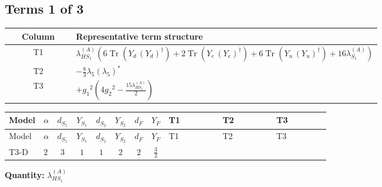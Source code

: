 \documentclass[8pt]{article}
\begin{document}
\begin{landscape}
\subsection*{Terms 1 of 3}
\begin{center}
\begin{tabular}{@{}c >{\raggedright\arraybackslash}p{0.82\linewidth}@{}}
\toprule
Column & Representative term structure \\
\midrule
T1 & \(\displaystyle {\lambda_{HS_1}^{(A)}} (6 \operatorname{Tr}\!\left({Y_d}\,\left({Y_d}\right)^{\dagger}\right)+2 \operatorname{Tr}\!\left({Y_e}\,\left({Y_e}\right)^{\dagger}\right)+6 \operatorname{Tr}\!\left({Y_u}\,\left({Y_u}\right)^{\dagger}\right)+16 {\lambda_{S_1}^{(A)}})\) \\
\midrule
T2 & \(\displaystyle -\frac{8}{3} {\lambda_5} \left({\lambda_5}\right)^{*}\) \\
\midrule
T3 & \(\displaystyle +{g_1}^2 \left(4 {g_2}^2-\frac{15 {\lambda_{HS_1}^{(A)}}}{2}\right)\) \\
\midrule
\bottomrule
\end{tabular}
\end{center}
\smallskip
\tiny
\begin{longtable}{@{}llcccccc >{\raggedright\arraybackslash}p{0.21\linewidth} >{\raggedright\arraybackslash}p{0.21\linewidth} >{\raggedright\arraybackslash}p{0.21\linewidth}@{}}
\toprule
Model & $\alpha$ & $d_{S_1}$ & $Y_{S_1}$ & $d_{S_2}$ & $Y_{S_2}$ & $d_F$ & $Y_F$ & T1 & T2 & T3 \\
\midrule
\endfirsthead
\toprule
Model & $\alpha$ & $d_{S_1}$ & $Y_{S_1}$ & $d_{S_2}$ & $Y_{S_2}$ & $d_F$ & $Y_F$ & T1 & T2 & T3 \\
\midrule
\endhead
T3-D & $2$ & $3$ & $1$ & $1$ & $2$ & $2$ & $\frac{3}{2}$ & \scriptsize\adjustbox{max width=\linewidth}{$\begin{gathered} {\lambda_{HS_1}^{(A)}} (6 \operatorname{Tr}\!\left({Y_d}\,\left({Y_d}\right)^{\dagger}\right)+2 \operatorname{Tr}\!\left({Y_e}\,\left({Y_e}\right)^{\dagger}\right)+6 \operatorname{Tr}\!\left({Y_u}\,\left({Y_u}\right)^{\dagger}\right)+16 {\lambda_{S_1}^{(A)}})\end{gathered}$} & \scriptsize\adjustbox{max width=\linewidth}{$\begin{gathered} -\frac{8}{3} {\lambda_5} \left({\lambda_5}\right)^{*}\end{gathered}$} & \scriptsize\adjustbox{max width=\linewidth}{$\begin{gathered} +{g_1}^2 \left(4 {g_2}^2-\frac{15 {\lambda_{HS_1}^{(A)}}}{2}\right)\end{gathered}$} \\
\midrule
\bottomrule
\end{longtable}
\clearpage
\noindent\textbf{Quantity: }$\lambda_{HS_1}^{(A)}$\par\smallskip

\end{landscape}
\end{document}
